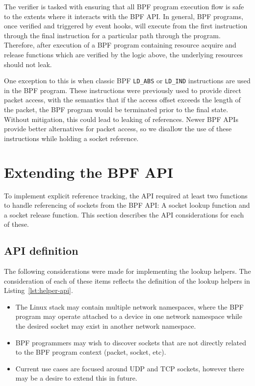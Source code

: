 \documentclass[10pt,sigconf,authorversion]{lpc}
\begin{document}
The verifier is tasked with ensuring that all BPF program execution flow is
safe to the extents where it interacts with the BPF API. In general, BPF
programs, once verified and triggered by event hooks, will execute from the
first instruction through the final instruction for a particular path through
the program. Therefore, after execution of a BPF program containing resource
acquire and release functions which are verified by the logic above, the
underlying resources should not leak.

One exception to this is when classic BPF \verb+LD_ABS+ or \verb+LD_IND+
instructions are used in the BPF program. These instructions were previously
used to provide direct packet access, with the semantics that if the access
offset exceeds the length of the packet, the BPF program would be terminated
prior to the final state. Without mitigation, this could lead to leaking of
references. Newer BPF APIs provide better alternatives for packet access, so we
disallow the use of these instructions while holding a socket reference.

\section{Extending the BPF API}

To implement explicit reference tracking, the API required at least two
functions to handle referencing of sockets from the BPF API: A socket lookup
function and a socket release function. This section describes the API
considerations for each of these.

\subsection{API definition}

The following considerations were made for implementing the lookup helpers. The
consideration of each of these items reflects the definition of the lookup
helpers in Listing~\ref{lst:helper-api}.

\begin{itemize}
    \item The Linux stack may contain multiple network namespaces, where the
          BPF program may operate attached to a device in one network namespace
          while the desired socket may exist in another network namespace.
    \item BPF programmers may wish to discover sockets that are not directly
          related to the BPF program context (packet, socket, etc).
    \item Current use cases are focused around UDP and TCP sockets, however
          there may be a desire to extend this in future.
\end{itemize}
\end{document}
